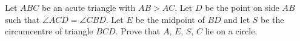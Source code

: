 Let $ABC$ be an acute triangle with $AB>AC$. Let $D$ be the point on side $AB$ such that $\angle ACD=\angle CBD$. Let $E$ be the midpoint of $BD$ and let $S$ be the circumcentre of triangle $BCD$. Prove that $A$, $E$, $S$, $C$ lie on a circle.
